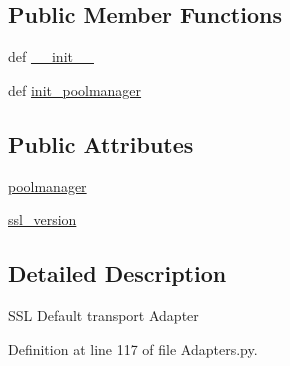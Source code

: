 \subsection*{Public Member Functions}
\begin{DoxyCompactItemize}
\item 
def \hyperlink{classRappCloud_1_1ServiceController_1_1Adapters_1_1SSLAdapter_a5a43d5ef9febed35ab23ab189ecdccea}{\-\_\-\-\_\-init\-\_\-\-\_\-}
\item 
def \hyperlink{classRappCloud_1_1ServiceController_1_1Adapters_1_1SSLAdapter_acc106aa48ecd6593fe63b87f3736b01c}{init\-\_\-poolmanager}
\end{DoxyCompactItemize}
\subsection*{Public Attributes}
\begin{DoxyCompactItemize}
\item 
\hyperlink{classRappCloud_1_1ServiceController_1_1Adapters_1_1SSLAdapter_ab008dcf219f19980b538ae27e2e867b4}{poolmanager}
\item 
\hyperlink{classRappCloud_1_1ServiceController_1_1Adapters_1_1SSLAdapter_a85858093a2b00a440246173adea9940c}{ssl\-\_\-version}
\end{DoxyCompactItemize}


\subsection{Detailed Description}
\begin{DoxyVerb}SSL Default transport Adapter \end{DoxyVerb}
 

Definition at line 117 of file Adapters.\-py.



